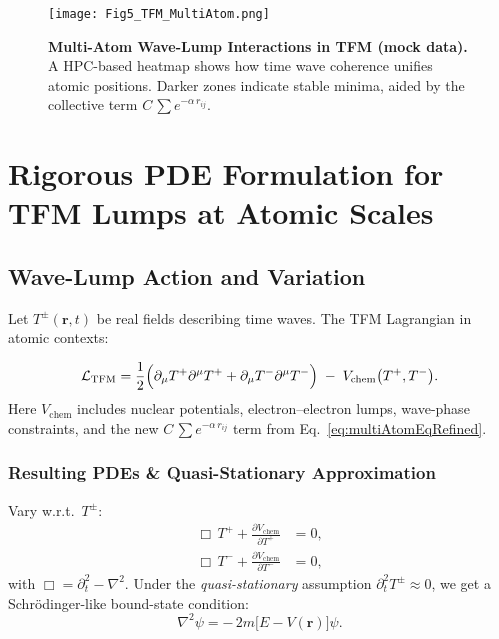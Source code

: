 \documentclass[12pt]{article}
\begin{document}
\begin{figure}[ht]
  \centering
  \texttt{[image: Fig5\_TFM\_MultiAtom.png]}
  \caption{
    \textbf{Multi-Atom Wave-Lump Interactions in TFM (mock data).}  
    A HPC-based heatmap shows how time wave coherence unifies atomic positions. 
    Darker zones indicate stable minima, aided by the collective term $C\,\sum e^{-\alpha\,r_{ij}}$.
  }
  \label{fig:TFM_MultiAtom}
\end{figure}

\section{Rigorous PDE Formulation for TFM Lumps at Atomic Scales}
\label{sec:RigorousPDE}

\subsection{Wave-Lump Action and Variation}
Let $T^\pm(\mathbf{r},t)$ be real fields describing time waves. The TFM Lagrangian in atomic contexts:

\begin{equation}
  \mathcal{L}_{\mathrm{TFM}} 
  =
  \frac{1}{2}\Bigl(\partial_\mu T^+ \partial^\mu T^+ + \partial_\mu T^- \partial^\mu T^-\Bigr)
  \;-\;
  V_{\mathrm{chem}}\bigl(T^+,T^-\bigr).
\end{equation}
Here $V_{\mathrm{chem}}$ includes nuclear potentials, electron–electron lumps, wave-phase constraints, and the new $C\,\sum e^{-\alpha\,r_{ij}}$ term from Eq.~\eqref{eq:multiAtomEqRefined}.

\subsubsection{Resulting PDEs \& Quasi-Stationary Approximation}
Vary w.r.t.\ $T^\pm$:
\begin{align}
  \Box\,T^+ 
  + 
  \frac{\partial V_{\mathrm{chem}}}{\partial T^+} 
  &= 
  0, 
  \label{eq:TP_PDE}\\
  \Box\,T^- 
  + 
  \frac{\partial V_{\mathrm{chem}}}{\partial T^-} 
  &= 
  0,
  \label{eq:TM_PDE}
\end{align}
with $\Box = \partial_t^2 - \nabla^2$. Under the \emph{quasi-stationary} assumption $\partial_t^2 T^\pm \approx 0$, we get a Schr\"odinger-like bound-state condition:
\[
  \nabla^2 \psi 
  =
  -\,2m\bigl[E - V(\mathbf{r})\bigr]\psi.
\]
\end{document}
